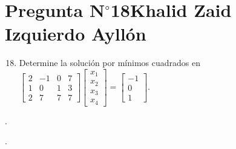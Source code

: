 \section{Pregunta N$^{\circ}$18\qquad Khalid Zaid Izquierdo Ayllón}

\begin{frame}
	\begin{enumerate}\setcounter{enumi}{17}
		\item

		      Determine la solución por mínimos cuadrados en
		      \begin{math}
			      \begin{bmatrix}
				      2 & -1 & 0 & 7 \\
				      1 & 0  & 1 & 3 \\
				      2 & 7  & 7 & 7
			      \end{bmatrix}
			      \begin{bmatrix}
				      x_{1} \\
				      x_{2} \\
				      x_{3} \\
				      x_{4}
			      \end{bmatrix}=
			      \begin{bmatrix}
				      -1 \\
				      0  \\
				      1
			      \end{bmatrix}
		      \end{math}.
	\end{enumerate}

	\begin{solution}

		.
	\end{solution}
\end{frame}

\begin{frame}
	\begin{solution}

		.
	\end{solution}
\end{frame}